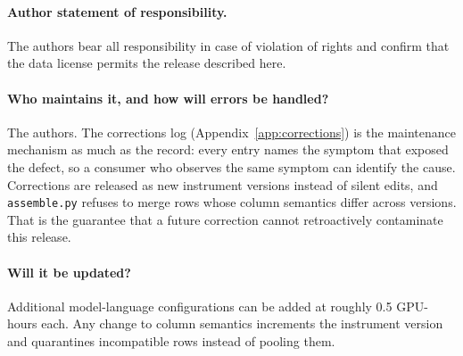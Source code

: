 \paragraph{Author statement of responsibility.} The authors bear all responsibility in case of
violation of rights and confirm that the data license permits the release described here.

\paragraph{Who maintains it, and how will errors be handled?} The authors. The corrections log
(Appendix~\ref{app:corrections}) is the maintenance mechanism as much as the record: every entry
names the symptom that exposed the defect, so a consumer who observes the same symptom can identify
the cause. Corrections are released as new instrument versions instead of silent edits, and
\texttt{assemble.py} refuses to merge rows whose column semantics differ across versions. That is the
guarantee that a future correction cannot retroactively contaminate this release.

\paragraph{Will it be updated?} Additional model-language configurations can be added at roughly 0.5
GPU-hours each. Any change to column semantics increments the instrument version and quarantines
incompatible rows instead of pooling them.
